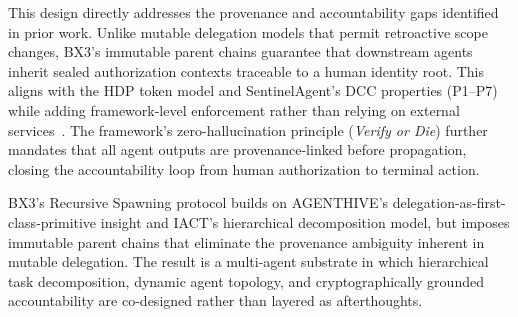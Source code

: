 This design directly addresses the provenance and accountability gaps identified in prior work. Unlike mutable delegation models that permit retroactive scope changes, BX3's immutable parent chains guarantee that downstream agents inherit sealed authorization contexts traceable to a human identity root. This aligns with the HDP token model and SentinelAgent's DCC properties (P1--P7) while adding framework-level enforcement rather than relying on external services~\cite{hdp2026,sentinelagent2025}. The framework's zero-hallucination principle (\emph{Verify or Die}) further mandates that all agent outputs are provenance-linked before propagation, closing the accountability loop from human authorization to terminal action.

BX3's Recursive Spawning protocol builds on AGENTHIVE's delegation-as-first-class-primitive insight and IACT's hierarchical decomposition model, but imposes immutable parent chains that eliminate the provenance ambiguity inherent in mutable delegation. The result is a multi-agent substrate in which hierarchical task decomposition, dynamic agent topology, and cryptographically grounded accountability are co-designed rather than layered as afterthoughts.


